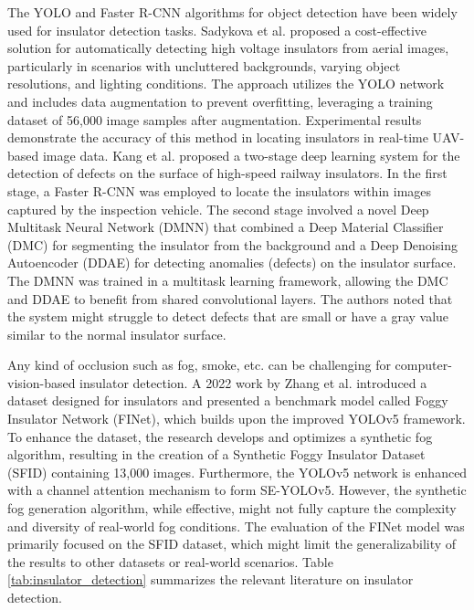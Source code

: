 The YOLO and Faster R-CNN algorithms for object detection have been widely used for insulator detection tasks. Sadykova et al. \cite{sadykova2019yolo} proposed a cost-effective solution for automatically detecting high voltage insulators from aerial images, particularly in scenarios with uncluttered backgrounds, varying object resolutions, and lighting conditions. The approach utilizes the YOLO network and includes data augmentation to prevent overfitting, leveraging a training dataset of 56,000 image samples after augmentation. Experimental results demonstrate the accuracy of this method in locating insulators in real-time UAV-based image data. Kang et al. \cite{kang_deep_2019} proposed a two-stage deep learning system for the detection of defects on the surface of high-speed railway insulators. In the first stage, a Faster R-CNN was employed to locate the insulators within images captured by the inspection vehicle. The second stage involved a novel Deep Multitask Neural Network (DMNN) that combined a Deep Material Classifier (DMC) for segmenting the insulator from the background and a Deep Denoising Autoencoder (DDAE) for detecting anomalies (defects) on the insulator surface. The DMNN was trained in a multitask learning framework, allowing the DMC and DDAE to benefit from shared convolutional layers. The authors noted that the system might struggle to detect defects that are small or have a gray value similar to the normal insulator surface.

Any kind of occlusion such as fog, smoke, etc. can be challenging for computer-vision-based insulator detection. A 2022 work by Zhang et al. \cite{zhang_finet_2022} introduced a dataset designed for insulators and presented a benchmark model called Foggy Insulator Network (FINet), which builds upon the improved YOLOv5 framework. To enhance the dataset, the research develops and optimizes a synthetic fog algorithm, resulting in the creation of a Synthetic Foggy Insulator Dataset (SFID) containing 13,000 images. Furthermore, the YOLOv5 network is enhanced with a channel attention mechanism to form SE-YOLOv5. However, the synthetic fog generation algorithm, while effective, might not fully capture the complexity and diversity of real-world fog conditions. The evaluation of the FINet model was primarily focused on the SFID dataset, which might limit the generalizability of the results to other datasets or real-world scenarios. Table \ref{tab:insulator_detection} summarizes the relevant literature on insulator detection.


